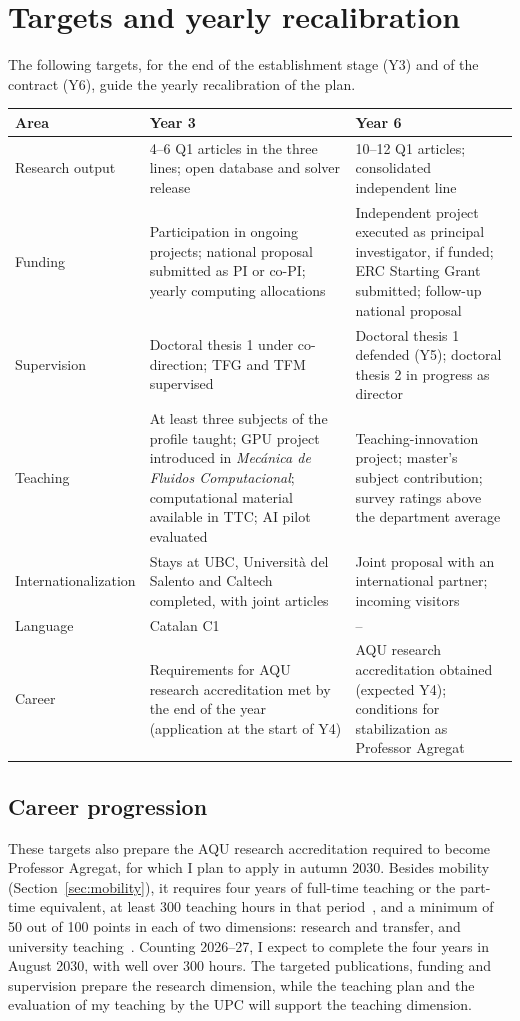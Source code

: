 \documentclass[11pt]{article}
\newcommand{\NEW}[1]{\iffinal #1\else{\color{red}#1}\fi}
\begin{document}
\section{Targets and yearly recalibration}\label{sec:targets}
The following targets, for the end of the establishment stage (Y3) and of the contract (Y6),
guide the yearly recalibration of the plan.
\begin{center}\small
\begin{tabularx}{\textwidth}{@{}p{3.0cm}XX@{}}
\toprule
\textbf{Area} & \textbf{Year 3} & \textbf{Year 6} \\
\midrule
Research output & 4--6 Q1 articles in the three lines; open database and solver release & 10--12 Q1 articles; consolidated independent line \\
Funding & Participation in ongoing projects; national proposal submitted as PI or co-PI; yearly computing allocations & Independent project executed as principal investigator, if funded; ERC Starting Grant submitted; follow-up national proposal \\
Supervision & Doctoral thesis 1 under co-direction; TFG and TFM supervised & Doctoral thesis 1 defended (Y5); doctoral thesis 2 in progress as director \\
Teaching & At least three subjects of the profile taught; \NEW{GPU project introduced in \emph{Mec\'anica de Fluidos Computacional}}; computational material available in TTC; AI pilot evaluated & Teaching-innovation project; master's subject contribution; survey ratings above the department average \\
Internationalization & Stays at UBC, Universit\`a del Salento and Caltech completed, with joint articles & Joint proposal with an international partner; incoming visitors \\
Language & Catalan C1 & -- \\
Career & Requirements for AQU research accreditation met by the end of the year (application at the start of Y4) & AQU research accreditation obtained (expected Y4); conditions for stabilization as Professor Agregat \\
\bottomrule
\end{tabularx}
\end{center}

\subsection{Career progression}
These targets also prepare the AQU research accreditation required
to become Professor Agregat, for which I plan to apply in autumn 2030. Besides mobility
(Section~\ref{sec:mobility}), it requires four years of full-time teaching or the part-time
equivalent, at least 300 teaching hours in that period~\cite{AQUProc2025}, and a minimum of 50 out
of 100 points in each of two dimensions: research and transfer, and university
teaching~\cite{AQUCrit2025}. Counting 2026--27, I expect to complete the four years in August 2030,
with well over 300 hours. The targeted publications, funding and supervision prepare the research
dimension, while the teaching plan and the evaluation of my teaching by the UPC will support the
teaching dimension.
\end{document}
